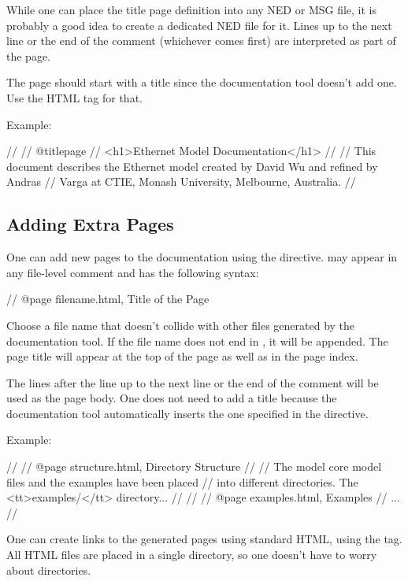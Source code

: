 While one can place the title page definition into any NED or MSG file, it is
probably a good idea to create a dedicated NED file for it. Lines up to the
next  line or the end of the comment (whichever comes first) are
interpreted as part of the page.

The page should start with a title since the documentation tool doesn't add
one. Use the  HTML tag for that.

Example:

\begin{ned}
//
// @titlepage
// <h1>Ethernet Model Documentation</h1>
//
// This document describes the Ethernet model created by David Wu and refined by Andras
// Varga at CTIE, Monash University, Melbourne, Australia.
//
\end{ned}


\subsection{Adding Extra Pages}
\label{sec:neddoc:adding-extra-pages}

One can add new pages to the documentation using the  directive.
 may appear in any file-level comment and has the following
syntax:

\begin{ned}
// @page filename.html, Title of the Page
\end{ned}

Choose a file name that doesn't collide with other files generated
by the documentation tool. If the file name does not end in ,
it will be appended. The page title will appear at the top of
the page as well as in the page index.

The lines after the  line up to the next  line or the
end of the comment will be used as the page body. One does not need to add
a title because the documentation tool automatically inserts the one
specified in the  directive.

Example:
\begin{ned}
//
// @page structure.html, Directory Structure
//
// The model core model files and the examples have been placed
// into different directories. The <tt>examples/</tt> directory...
//
//
// @page examples.html, Examples
// ...
//
\end{ned}

One can create links to the generated pages using standard HTML,
using the  tag. All HTML files are
placed in a single directory, so one doesn't have to worry about
directories.

